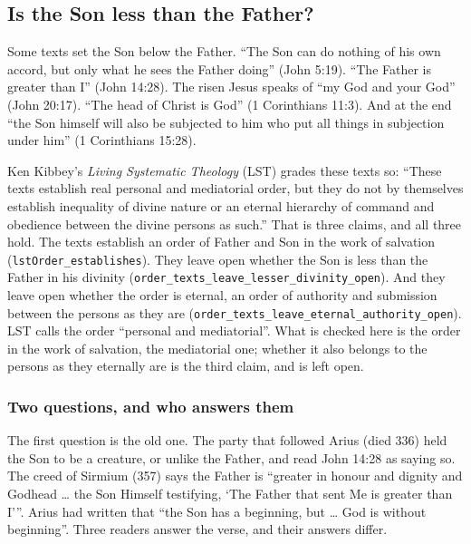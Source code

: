 \documentclass[11pt,paper=\testimonypaper,DIV=13,parskip=false]{scrartcl}
\begin{document}
\subsection*{Is the Son less than the Father?}
Some texts set the Son below the Father. “The Son can do nothing of his own accord, but only what he sees the Father doing” (John 5:19). “The Father is greater than I” (John 14:28). The risen Jesus speaks of “my God and your God” (John 20:17). “The head of Christ is God” (1 Corinthians 11:3). And at the end “the Son himself will also be subjected to him who put all things in subjection under him” (1 Corinthians 15:28).

Ken Kibbey’s \emph{Living Systematic Theology} (LST) grades these texts so: “These texts establish real personal and mediatorial order, but they do not by themselves establish inequality of divine nature or an eternal hierarchy of command and obedience between the divine persons as such.” That is three claims, and all three hold. The texts establish an order of Father and Son in the work of salvation (\texttt{lst\allowbreak{}Order\_\allowbreak{}establishes}). They leave open whether the Son is less than the Father in his divinity (\texttt{order\_\allowbreak{}texts\_\allowbreak{}leave\_\allowbreak{}lesser\_\allowbreak{}divinity\_\allowbreak{}open}). And they leave open whether the order is eternal, an order of authority and submission between the persons as they are (\texttt{order\_\allowbreak{}texts\_\allowbreak{}leave\_\allowbreak{}eternal\_\allowbreak{}authority\_\allowbreak{}open}). LST calls the order “personal and mediatorial”. What is checked here is the order in the work of salvation, the mediatorial one; whether it also belongs to the persons as they eternally are is the third claim, and is left open.

\subsubsection*{Two questions, and who answers them}
The first question is the old one. The party that followed Arius (died 336) held the Son to be a creature, or unlike the Father, and read John 14:28 as saying so. The creed of Sirmium (357) says the Father is “greater in honour and dignity and Godhead … the Son Himself testifying, ‘The Father that sent Me is greater than I’”. Arius had written that “the Son has a beginning, but … God is without beginning”. Three readers answer the verse, and their answers differ.
\end{document}
